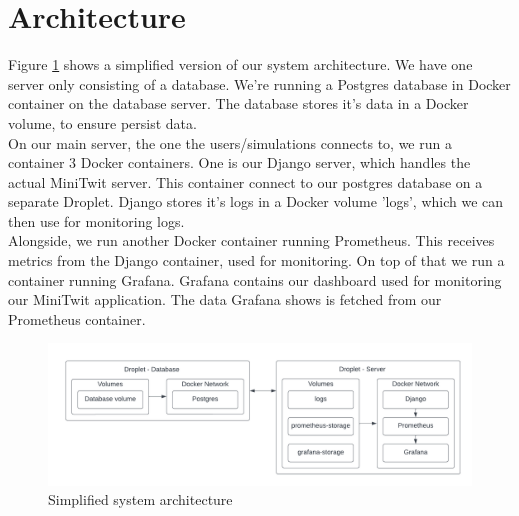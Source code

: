 \section*{Architecture}

Figure \ref{fig:system-arch} shows a simplified version of our system architecture. We have one server only consisting of a database. We're running a Postgres database in Docker container on the database server. The database stores it's data in a Docker volume, to ensure persist data.\\
On our main server, the one the users/simulations connects to, we run a container 3 Docker containers. One is our Django server, which handles the actual MiniTwit server. This container connect to our postgres database on a separate Droplet. Django stores it's logs in a Docker volume 'logs', which we can then use for monitoring logs.\\
Alongside, we run another Docker container running Prometheus. This receives metrics from the Django container, used for monitoring. On top of that we run a container running Grafana. Grafana contains our dashboard used for monitoring our MiniTwit application. The data Grafana shows is fetched from our Prometheus container.

\begin{figure}
    \centering
    \includegraphics[width=\textwidth]{images/system-architechture.png}
    \caption{Simplified system architecture}
    \label{fig:system-arch}
\end{figure}